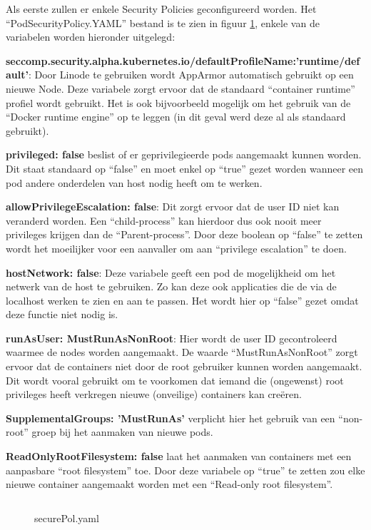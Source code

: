 Als eerste zullen er enkele Security Policies geconfigureerd worden. Het ``PodSecurityPolicy.YAML'' bestand is te zien in figuur \ref{securePol}, enkele van de variabelen worden hieronder uitgelegd: 


\textbf{seccomp.security.alpha.kubernetes.io/defaultProfileName:'runtime/default'}: Door Linode te gebruiken wordt AppArmor automatisch gebruikt op een nieuwe Node. Deze variabele zorgt ervoor dat de standaard ``container runtime'' profiel wordt gebruikt. Het is ook bijvoorbeeld mogelijk om het gebruik van de ``Docker runtime engine'' op te leggen (in dit geval werd deze al als standaard gebruikt).

\textbf{privileged: false} beslist of er geprivilegieerde pods aangemaakt kunnen worden. Dit staat standaard op ``false'' en moet enkel op ``true'' gezet worden wanneer een pod andere onderdelen van host nodig heeft om te werken. 

\textbf{allowPrivilegeEscalation: false}: Dit zorgt ervoor dat de user ID niet kan veranderd worden. Een ``child-process'' kan hierdoor dus ook nooit meer privileges krijgen dan de ``Parent-process''. Door deze boolean op ``false'' te zetten wordt het moeilijker voor een aanvaller om aan ``privilege escalation'' te doen.

\textbf{hostNetwork: false}: Deze variabele geeft een pod de mogelijkheid om het netwerk van de host te gebruiken. Zo kan deze ook applicaties die de via de localhost werken te zien en aan te passen. Het wordt hier op ``false'' gezet omdat deze functie niet nodig is.

\textbf{runAsUser: MustRunAsNonRoot}: Hier wordt de user ID gecontroleerd waarmee de nodes worden aangemaakt. De waarde ``MustRunAsNonRoot'' zorgt ervoor dat de containers niet door de root gebruiker kunnen worden aangemaakt. Dit wordt vooral gebruikt om te voorkomen dat iemand die (ongewenst) root privileges heeft verkregen nieuwe (onveilige) containers kan creëren.

\textbf{SupplementalGroups: 'MustRunAs'} verplicht hier het gebruik van een ``non-root'' groep bij het aanmaken van nieuwe pods. 

\textbf{ReadOnlyRootFilesystem: false} laat het aanmaken van containers met een aanpasbare ``root filesystem'' toe. Door deze variabele op ``true'' te zetten zou elke nieuwe container aangemaakt worden met een ``Read-only root filesystem''.

\begin{figure}[h] 
	\centering
	\inputminted[fontsize=\footnotesize,linenos]{yaml}{files/securePol.yaml}
	\caption{securePol.yaml}
	\label{securePol}
\end{figure}

